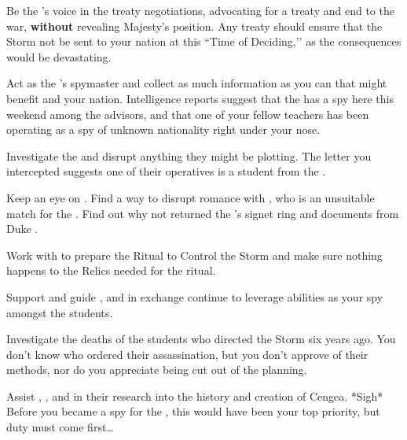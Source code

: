 \documentclass[char]{GL2020}
\begin{document}
\begin{itemz}
    \item Be the \cQueen{\Monarch}'s voice in the treaty negotiations, advocating for a treaty and end to the war, \textbf{without} revealing \cQueen{\Their} Majesty's position. Any treaty should ensure that the Storm not be sent to your nation at this ``Time of Deciding,’’ as the consequences would be devastating.
    \item Act as the \cQueen{\Monarch}'s spymaster and collect as much information as you can that might benefit \cQueen{\them} and your nation. Intelligence reports suggest that the \pTech{} has a spy here this weekend among the advisors, and that one of your fellow teachers has been operating as a spy of unknown nationality right under your nose.
    \item Investigate the \pGoaties{} and disrupt anything they might be plotting. The letter you intercepted suggests one of their operatives is a student from the \pFarm{}.
    \item Keep an eye on \cPrince{}. Find a way to disrupt \cPrince{\their} romance with \cPirate{}, who is an unsuitable match for the \cPrince{\heir}. Find out why \cPrince{\theyhave} not returned the \cQueen{\Monarch}'s signet ring and documents from Duke \cChupStudent{\formal}.
    \item Work with \cLibrarian{} to prepare the Ritual to Control the Storm and make sure nothing happens to the Relics needed for the ritual.
    \item Support and guide \cLibAssist{}, and in exchange continue to leverage \cLibAssist{\their} abilities as your spy amongst the students.
    \item Investigate the deaths of the students who directed the Storm six years ago. You don't know who ordered their assassination, but you don't approve of their methods, nor do you appreciate being cut out of the planning.
    \item Assist \cEbbPriest{}, \cHeadScientist{}, and \cScholarship{} in their research into the history and creation of Cengea. *Sigh* Before you became a spy for the \cQueen{\Monarch}, this would have been your top priority, but duty must come first…
\end{itemz}
\end{document}
